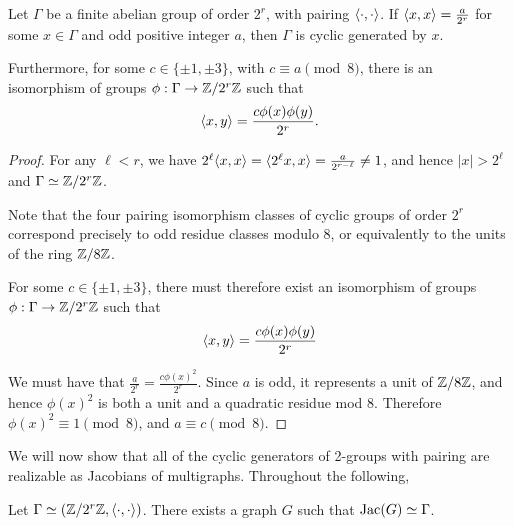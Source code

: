 \documentclass{amsart}
\begin{document}
\begin{lem}
  \label{lem:2group_pairing_mod8}
  Let $\Gamma$ be a finite abelian group of order $2^r$, with pairing
  $\langle \cdot, \cdot \rangle$. If $\langle x, x \rangle = \frac{a}{2^r}$ for some $x
  \in \Gamma$ and odd positive integer $a$, then $\Gamma$ is cyclic
  generated by $x$.

  Furthermore, for some $c \in \{\pm 1, \pm 3\}$, with $c \equiv a
  \pmod 8$, there is an isomorphism of groups $\phi:\Gamma \to
  \mathbb{Z}/2^r\mathbb{Z}$ such that
  \begin{equation*}
    \langle x, y \rangle = \frac{c\phi(x)\phi(y)}{2^r}.
  \end{equation*}
\end{lem}
\begin{proof}
  For any $\ell < r$, we have $2^\ell\langle x, x \rangle = \langle 2^\ell x, x \rangle
  = \frac{a}{2^{r - \ell}} \ne 1$, and hence $|x| > 2^\ell$ and
  $\Gamma \simeq \mathbb{Z}/2^r\mathbb{Z}$.

  Note that the four pairing isomorphism classes of cyclic groups of
  order $2^r$ correspond precisely to odd residue classes modulo $8$,
  or equivalently to the units of the ring $\mathbb{Z}/8\mathbb{Z}$.

  For some $c \in \{\pm 1, \pm 3\}$, there must therefore exist an
  isomorphism of groups $\phi:\Gamma \to \mathbb{Z}/2^r\mathbb{Z}$ such that
  \begin{equation*}
    \langle x, y \rangle = \frac{c\phi(x)\phi(y)}{2^r}
  \end{equation*}

  We must have that $\frac{a}{2^r} = \frac{c\phi(x)^2}{2^r}$. Since
  $a$ is odd, it represents a unit of $\mathbb{Z}/8\mathbb{Z}$, and hence $\phi(x)^2$
  is both a unit and a quadratic residue mod $8$. Therefore $\phi(x)^2
  \equiv 1 \pmod 8$, and $a \equiv c \pmod 8$.
\end{proof}

We will now show that all of the cyclic generators of 2-groups with
pairing are realizable as Jacobians of multigraphs. Throughout the
following, 

\begin{thm} Let $\Gamma \simeq (\mathbb{Z}/2^r\mathbb{Z},
  \langle \cdot, \cdot \rangle)$. There exists a graph $G$ such that $\operatorname{Jac}(G)
  \simeq \Gamma$. 
\end{thm}
\end{document}
